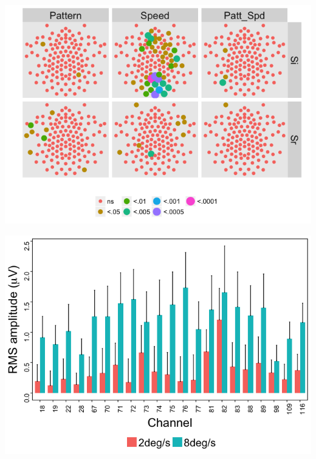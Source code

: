 \documentclass[landscape,final,paperwidth=48in,paperheight=33in,fontscale=0.285]{baposter}
\begin{document}
\begin{poster}
{}
    {
 \begin{center}

 \includegraphics[scale=0.3,valign=t]{channel-effects-plot-1.png}
 
 \includegraphics[scale=0.3,valign=t]{figX-vector-amplitude-barplots-speed-1-1F1.png}
 

\end{center}}
\end{poster}
\end{document}
